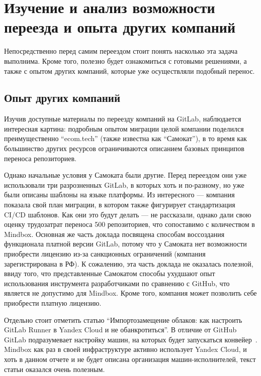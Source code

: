 \chapter{Изучение и анализ возможности переезда и опыта других компаний} \label{ch:ch1}
Непосредственно перед самим переездом стоит понять насколько эта задача выполнима.
Кроме того, полезно будет ознакомиться с готовыми решениями, а также с опытом других компаний, которые уже осуществляли подобный перенос.

\section{Опыт других компаний}\label{sec:other-companies-expirience}
Изучив доступные материалы по переезду компаний на GitLab,
наблюдается интересная картина: подробным опытом миграции целой компании поделился преимущественно \enquote{ecom.tech}
(также известна как \enquote{Самокат})\cite{samokat-conference-talk},
в то время как большинство других ресурсов ограничиваются описанием базовых принципов переноса репозиториев.

Однако начальные условия у Самоката были другие.
Перед переездом они уже использовали три разрозненных GitLab, в которых хоть и по-разному, но уже были описаны шаблоны на языке платформы.
Из интересного — компания показала свой план миграции, в котором также фигурирует стандартизация CI/CD шаблонов.
Как они это будут делать — не рассказали, однако дали свою оценку трудозатрат переноса 500 репозиториев, что сопоставимо с количеством в Mindbox.
Основная же часть доклада посвящена способам воссоздания функционала платной версии GitLab, потому что у
Самоката нет возможности приобрести лицензию из-за санкционных ограничений (компания зарегистрирована в РФ).
К сожалению, эта часть доклада не оказалась полезной,
ввиду того, что представленные Самокатом способы ухудшают опыт использования инструмента разработчиками по сравнению с GitHub,
что является не допустимо для Mindbox.
Кроме того, компания может позволить себе приобрести платную лицензию.

Отдельно стоит отметить статью \enquote{Импортозамещение облаков: как настроить GitLab Runner в Yandex Cloud и не обанкротиться}\cite{yc-runners-article}.
В отличие от GitHub GitLab подразумевает настройку машин, на которых будет запускаться конвейер~\cite{gl-runners}.
Mindbox как раз в своей инфраструктуре активно использует Yandex Cloud\cite{yc}, и хоть в данном отчете и не будет описана организация машин-исполнителей,
текст статьи оказался очень полезным.

